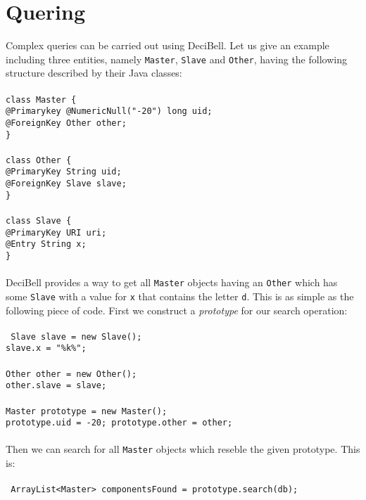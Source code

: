 \documentclass[a4paper,10pt]{article}
\begin{document}
\section*{Quering}
Complex queries can be carried out using DeciBell. Let us give an example including three entities, namely 
\texttt{Master}, \texttt{Slave} and \texttt{Other}, having the following structure described by 
their Java classes:\\\\
\texttt{class Master \{\\
\hspace*{6} @Primarykey @NumericNull("-20") long uid;\\
\hspace*{6} @ForeignKey Other other;\\
\}\\
\\
class Other \{\\
\hspace*{6} @PrimaryKey String uid;\\
\hspace*{6} @ForeignKey Slave slave;\\
\}\\
\\
class Slave \{\\
@PrimaryKey URI uri;\\
@Entry String x;\\
\}\\\\
}
DeciBell provides a way to get all \texttt{Master} objects having an \texttt{Other} which has
some \texttt{Slave} with a value for \texttt{x} that contains the letter \texttt{d}. This is
as simple as the following piece of code. First we construct a \emph{prototype} for our 
search operation:\\\\
\texttt{
Slave slave = new Slave();\\
slave.x = "\%k\%";\\
\\
Other other = new Other();\\
other.slave = slave;\\
\\
Master prototype = new Master();\\
prototype.uid = -20;
prototype.other = other;\\\\
}
\noindent
Then we can search for all \texttt{Master} objects which reseble the given prototype. This is:\\\\
\texttt{
ArrayList<Master> componentsFound = prototype.search(db);\\
}
\end{document}
